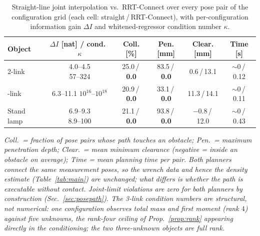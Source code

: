 \begin{table}[!htb]
\caption{Straight-line joint interpolation vs.\ RRT-Connect over every pose pair
of the configuration grid (each cell: straight\,/\,RRT-Connect), with
per-configuration information gain $\Delta I$ and whitened-regressor condition
number $\kappa$.}
\label{tab:path}
\centering
\scriptsize
\setlength{\tabcolsep}{3pt}
\begin{tabular}{lccccc}
\toprule
Object & \shortstack{$\Delta I$ [nat] /\\cond.\ $\kappa$} & \shortstack{Coll.\\{[\%]}} & \shortstack{Pen.\\{[mm]}} & \shortstack{Clear.\\{[mm]}} & \shortstack{Time\\{[s]}} \\
\midrule
2-link & \shortstack{4.0--4.5\\57--324} & 25.0\,/\,\textbf{0.0} & 83.5\,/\,\textbf{0.0} & 0.6\,/\,13.1 & $\sim$0\,/\,0.12 \\
\addlinespace[2pt]
3-link & \shortstack{6.3--11.1\\$10^{16}$--$10^{18}$} & 20.9\,/\,\textbf{0.0} & 33.1\,/\,\textbf{0.0} & 11.3\,/\,14.1 & $\sim$0\,/\,0.11 \\
\addlinespace[2pt]
Stand lamp & \shortstack{6.9--9.3\\8.9--100} & 21.1\,/\,\textbf{0.0} & 93.8\,/\,\textbf{0.0} & $-0.8$\,/\,12.0 & $\sim$0\,/\,0.43 \\
\bottomrule
\end{tabular}
\vspace{2pt}
\parbox{\linewidth}{\footnotesize \textit{Coll.\ = fraction of pose pairs whose path
touches an obstacle; Pen.\ = maximum penetration depth; Clear.\ = mean minimum
clearance (negative = inside an obstacle on average); Time = mean planning time per
pair. Both planners connect the same measurement poses, so the wrench data and
hence the density estimate (Table~\ref{tab:main}) are unchanged; what differs is
whether the path is executable without contact. Joint-limit violations are zero for both planners by construction
(Sec.~\ref{sec:posepath}). The 3-link condition numbers are structural, not
numerical: one configuration observes total mass and first moment (rank $4$)
against five unknowns, the rank-four ceiling of Prop.~\ref{prop:rank} appearing
directly in the conditioning; the two three-unknown objects are full rank.}}
\end{table}
